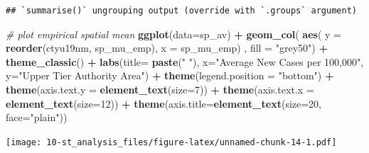 \documentclass[
]{book}
\newenvironment{Shaded}{\begin{snugshade}}{\end{snugshade}}
\newcommand{\CommentTok}[1]{\textcolor[rgb]{0.56,0.35,0.01}{\textit{#1}}}
\newcommand{\DataTypeTok}[1]{\textcolor[rgb]{0.13,0.29,0.53}{#1}}
\newcommand{\DecValTok}[1]{\textcolor[rgb]{0.00,0.00,0.81}{#1}}
\newcommand{\KeywordTok}[1]{\textcolor[rgb]{0.13,0.29,0.53}{\textbf{#1}}}
\newcommand{\NormalTok}[1]{#1}
\newcommand{\OperatorTok}[1]{\textcolor[rgb]{0.81,0.36,0.00}{\textbf{#1}}}
\newcommand{\StringTok}[1]{\textcolor[rgb]{0.31,0.60,0.02}{#1}}
\begin{document}
\begin{Shaded}
\end{Shaded}

\begin{verbatim}
## `summarise()` ungrouping output (override with `.groups` argument)
\end{verbatim}

\begin{Shaded}
\begin{Highlighting}[]
\CommentTok{# plot empirical spatial mean}
\KeywordTok{ggplot}\NormalTok{(}\DataTypeTok{data=}\NormalTok{sp_av) }\OperatorTok{+}
\StringTok{  }\KeywordTok{geom_col}\NormalTok{( }\KeywordTok{aes}\NormalTok{( }\DataTypeTok{y =} \KeywordTok{reorder}\NormalTok{(ctyu19nm, sp_mu_emp), }\DataTypeTok{x =}\NormalTok{ sp_mu_emp) , }\DataTypeTok{fill =} \StringTok{"grey50"}\NormalTok{) }\OperatorTok{+}
\StringTok{  }\KeywordTok{theme_classic}\NormalTok{() }\OperatorTok{+}
\StringTok{  }\KeywordTok{labs}\NormalTok{(}\DataTypeTok{title=} \KeywordTok{paste}\NormalTok{(}\StringTok{" "}\NormalTok{), }\DataTypeTok{x=}\StringTok{"Average New Cases per 100,000"}\NormalTok{, }\DataTypeTok{y=}\StringTok{"Upper Tier Authority Area"}\NormalTok{) }\OperatorTok{+}
\StringTok{  }\KeywordTok{theme}\NormalTok{(}\DataTypeTok{legend.position =} \StringTok{"bottom"}\NormalTok{) }\OperatorTok{+}
\StringTok{  }\KeywordTok{theme}\NormalTok{(}\DataTypeTok{axis.text.y =} \KeywordTok{element_text}\NormalTok{(}\DataTypeTok{size=}\DecValTok{7}\NormalTok{)) }\OperatorTok{+}
\StringTok{  }\KeywordTok{theme}\NormalTok{(}\DataTypeTok{axis.text.x =} \KeywordTok{element_text}\NormalTok{(}\DataTypeTok{size=}\DecValTok{12}\NormalTok{)) }\OperatorTok{+}
\StringTok{  }\KeywordTok{theme}\NormalTok{(}\DataTypeTok{axis.title=}\KeywordTok{element_text}\NormalTok{(}\DataTypeTok{size=}\DecValTok{20}\NormalTok{, }\DataTypeTok{face=}\StringTok{"plain"}\NormalTok{))}
\end{Highlighting}
\end{Shaded}

\texttt{[image: 10-st\_analysis\_files/figure-latex/unnamed-chunk-14-1.pdf]}
\end{document}

